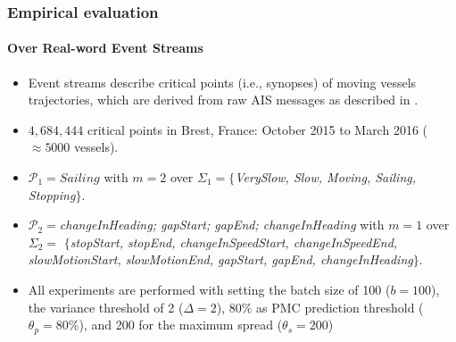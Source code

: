 \begin{frame}
	
	\frametitle{Empirical evaluation }
	\framesubtitle{Over Real-word Event Streams}
\begin{itemize}
	
	\item<only@1> Event streams describe critical points (i.e., synopses) of moving vessels trajectories, which are derived from raw AIS messages as described in \cite{synopses1}.
	\item<only@1> $4,684,444$ critical points  in Brest, France: October 2015 to March 2016 ($\approx5000$ vessels). 
	\item<only@1>  $\mathcal{P}_1=Sailing$ with $m=2$ over $\Sigma_1=$$\{$\textit{VerySlow, Slow, Moving,  Sailing, Stopping}$\}$.  
	\item<only@2> $\mathcal{P}_2=$\textit{changeInHeading; gapStart; gapEnd; changeInHeading} with $m=1$ over $\Sigma_2=$ 
	$\{$\textit{stopStart, stopEnd, changeInSpeedStart, changeInSpeedEnd,  slowMotionStart, slowMotionEnd, gapStart, gapEnd, changeInHeading}$\}$.
	\item<only@2> All experiments are performed with setting the batch size of 100  ($b=100$), the variance threshold of 2 ($\Delta=2$), $80\%$ as PMC prediction threshold ($\theta_{p}=80\%$), and 200 for the maximum spread ($\theta_{s}=200$)
\end{itemize}
	
\end{frame}


